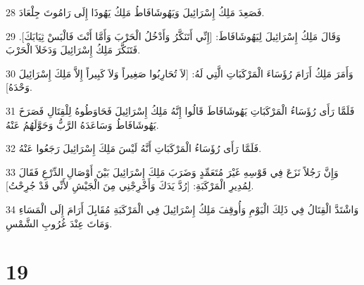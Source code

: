 \par 28 فَصَعِدَ مَلِكُ إِسْرَائِيلَ وَيَهُوشَافَاطُ مَلِكُ يَهُوذَا إِلَى رَامُوتَ جِلْعَادَ.
\par 29 وَقَالَ مَلِكُ إِسْرَائِيلَ لِيَهُوشَافَاطَ: [إِنِّي أَتَنَكَّرُ وَأَدْخُلُ الْحَرْبَ وَأَمَّا أَنْتَ فَالْبَسْ ثِيَابَكَ]. فَتَنَكَّرَ مَلِكُ إِسْرَائِيلَ وَدَخَلاَ الْحَرْبَ.
\par 30 وَأَمَرَ مَلِكُ أَرَامَ رُؤَسَاءَ الْمَرْكَبَاتِ الَّتِي لَهُ: [لاَ تُحَارِبُوا صَغِيراً وَلاَ كَبِيراً إِلاَّ مَلِكَ إِسْرَائِيلَ وَحْدَهُ].
\par 31 فَلَمَّا رَأَى رُؤَسَاءُ الْمَرْكَبَاتِ يَهُوشَافَاطَ قَالُوا إِنَّهُ مَلِكُ إِسْرَائِيلَ فَحَاوَطُوهُ لِلْقِتَالِ فَصَرَخَ يَهُوشَافَاطُ وَسَاعَدَهُ الرَّبُّ وَحَوَّلَهُمُ عَنْهُ.
\par 32 فَلَمَّا رَأَى رُؤَسَاءُ الْمَرْكَبَاتِ أَنَّهُ لَيْسَ مَلِكَ إِسْرَائِيلَ رَجَعُوا عَنْهُ.
\par 33 وَإِنَّ رَجُلاً نَزَعَ فِي قَوْسِهِ غَيْرَ مُتَعَمِّدٍ وَضَرَبَ مَلِكَ إِسْرَائِيلَ بَيْنَ أَوْصَالِ الدِّرْعِ فَقَالَ لِمُدِيرِ الْمَرْكَبَةِ: [رُدَّ يَدَكَ وَأَخْرِجْنِي مِنَ الْجَيْشِ لأَنِّي قَدْ جُرِحْتُ].
\par 34 وَاشْتَدَّ الْقِتَالُ فِي ذَلِكَ الْيَوْمِ وَأُوقِفَ مَلِكُ إِسْرَائِيلَ فِي الْمَرْكَبَةِ مُقَابِلَ أَرَامَ إِلَى الْمَسَاءِ وَمَاتَ عِنْدَ غُرُوبِ الشَّمْسِ.

\chapter{19}

